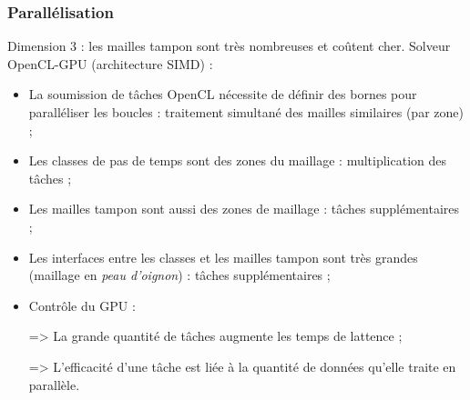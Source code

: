 \begin{frame}
\frametitle{Parallélisation}
\vfill
Dimension 3 : les mailles tampon sont très nombreuses et coûtent cher.
\vfill
Solveur OpenCL-GPU (architecture SIMD) :
\begin{itemize}
\item La soumission de tâches OpenCL nécessite de définir des bornes pour paralléliser les boucles : traitement simultané des mailles similaires (par zone) ;
\item Les classes de pas de temps sont des zones du maillage : multiplication des tâches ;
\item Les mailles tampon sont aussi des zones de maillage : tâches supplémentaires ;
\item Les interfaces entre les classes et les mailles tampon sont très grandes (maillage en \textit{peau d'oignon}) : tâches supplémentaires ;
\vfill
\item Contrôle du GPU :
\item [=>] La grande quantité de tâches augmente les temps de lattence ;
\item [=>] L'efficacité d'une tâche est liée à la quantité de données qu'elle traite en parallèle.
\end{itemize}
\vfill
\end{frame}

